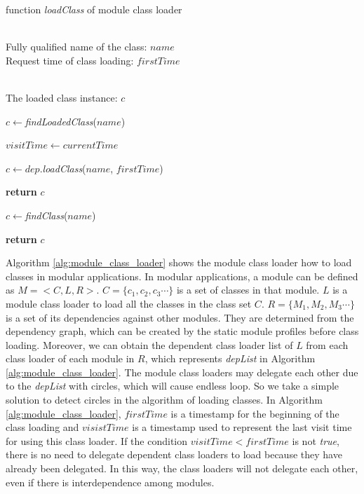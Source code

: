 \documentclass[conference]{IEEEtran}
\begin{document}
\begin{algorithm}[ht]
\caption{function \emph{loadClass} of module class loader}
\label{alg:module_class_loader}
\begin{algorithmic}[1]
\REQUIRE ~~\\
Fully qualified name of the class: $name$ \\
Request time of class loading: $firstTime$

\ENSURE ~~\\
The loaded class instance: $c$

\STATE $c\leftarrow$\emph{findLoadedClass}($name$)


	\STATE $visitTime\leftarrow currentTime$
	
		
		\STATE $c\leftarrow dep.$\emph{loadClass}($name$, $firstTime$)
		
			
			\STATE \textbf{return} $c$

		\ENDIF
	
	\ENDFOR

	\STATE $c\leftarrow$\emph{findClass}($name$)

\ENDIF
	
\STATE \textbf{return} $c$



\end{algorithmic}
\end{algorithm}


Algorithm \ref{alg:module_class_loader} shows the module class loader how to load classes in modular applications.
In modular applications, a module can be defined as $M=<C, L, R>$. 
$C=\{c_1, c_2, c_3\cdots\}$ is a set of classes in that module. 
$L$ is a module class loader to load all the classes in the class set $C$.
$R=\{M_1, M_2, M_3\cdots\}$ is a set of its dependencies against other modules. 
They are determined from the dependency graph, which can be created by the static module profiles before class loading.
Moreover, we can obtain the dependent class loader list of $L$ from each class loader of each module in $R$, which represents \emph{depList} in Algorithm \ref{alg:module_class_loader}. 
The module class loaders may delegate each other due to the \emph{depList} with circles, which will cause endless loop.
So we take a simple solution to detect circles in the algorithm of loading classes.
In Algorithm \ref{alg:module_class_loader}, $firstTime$ is a timestamp for the beginning of the class loading and $visistTime$ is a timestamp used to represent the last visit time for using this class loader. 
If the condition $visitTime < firstTime$ is not \emph{true}, there is no need to delegate dependent class loaders to load because they have already been delegated.
In this way, the class loaders will not delegate each other, even if there is interdependence among modules.
\end{document}

